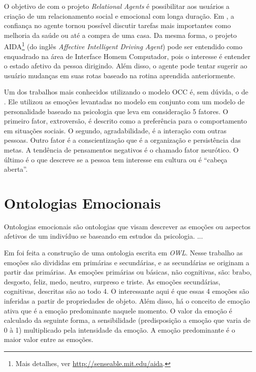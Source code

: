 O objetivo de \citet{bick2003relational} com o projeto \emph{Relational
Agents} é possibilitar aos usuários a criação de um relacionamento social e
emocional com longa duração.  Em \citet{bickmore2009virtual}, a confiança no
agente tornou possível discutir tarefas mais importantes como melhoria da saúde
ou até a compra de uma casa. Da mesma forma, o projeto
AIDA\footnote{Mais detalhes, ver \url{http://senseable.mit.edu/aida}.} (do
inglês \emph{Affective Intelligent Driving Agent}) pode ser entendido como
enquadrado na área de Interface Homem Computador, pois o interesse é entender o
estado afetivo da pessoa dirigindo. Além disso, o agente pode tentar sugerir
ao usuário mudanças em suas rotas baseado na rotina aprendida anteriormente.

Um dos trabalhos mais conhecidos utilizando o modelo OCC é, sem dúvida, o de
\citet{kshirsagar2002multilayer}. Ele utilizou as emoções levantadas no modelo
em conjunto com um modelo de personalidade baseado na psicologia que leva em
consideração 5 fatores. O primeiro fator, extroversão, é descrito como a
preferência para o comportamento em situações sociais. O segundo,
agradabilidade, é a interação com outras pessoas. Outro fator é a
conscientização que é a organização e persistência das metas. A tendência de
pensamentos negativos é o chamado fator neurótico. O último é o que descreve
se a pessoa tem interesse em cultura ou é ``cabeça aberta''.

\section{Ontologias Emocionais} \label{cap:eda:oe}

Ontologias emocionais são ontologias que visam descrever as emoções ou
aspectos afetivos de um indivíduo se baseando em estudos da psicologia.
...

Em \citet{benta2007ontology} foi feita a construção de uma ontologia escrita
em \emph{OWL}. Nesse trabalho as emoções são divididas em primárias e
secundárias, e as secundárias se originam a partir das primárias. As emoções
primárias ou básicas, não cognitivas, são: brabo, desgosto, feliz, medo,
neutro, surpreso e triste. As emoções secundárias, cognitivas, descritas são
ao todo 4. O interessante aqui é que essas 4 emoções são inferidas a partir
de propriedades de objeto. Além disso, há o conceito de emoção ativa que é a
emoção predominante naquele momento. O valor da emoção é calculado da seguinte
forma, a sensibilidade (predisposição a emoção que varia de 0 à 1)
multiplicado pela intensidade da emoção. A emoção predominante é o maior valor
entre as emoções.

